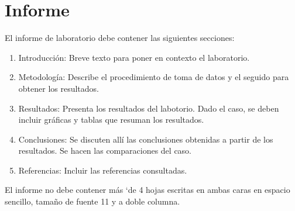 \documentclass[10pt, a4paper]{exam}
\begin{document}
\section{Informe}
El informe de laboratorio debe contener las siguientes secciones: 
\begin{enumerate}
    \item Introducci\'on: Breve texto para poner en contexto el laboratorio.
    \item Metodolog\'ia: Describe el procedimiento de toma de datos y el seguido para obtener los resultados.
    \item Resultados: Presenta los resultados del labotorio. Dado el caso, se deben incluir gr\'aficas y tablas que resuman los resultados.
    \item Conclusiones: Se discuten all\'i las conclusiones obtenidas a partir de los resultados. Se hacen las comparaciones del caso.
    \item Referencias: Incluir las referencias consultadas.
\end{enumerate}
El informe no debe contener m\'as `de 4 hojas escritas en ambas caras en espacio sencillo, tama\~no de fuente 11 y a doble columna. 
\end{document}
